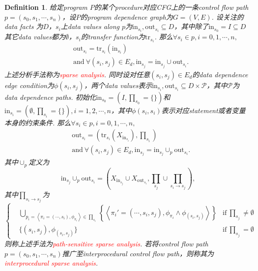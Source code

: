 \documentclass{article}
\newtheorem{definition}[theorem]{Definition}
\newcommand{\redt}[1]{\textcolor{red}{#1}}
\newcommand{\abracket}[1]{\ensuremath{\left< #1 \right>}}
\begin{document}
\newpage
\begin{definition}
\rm 给定program $P$的某个procedure对应CFG上的一条control flow path  $p = (s_0, s_1,\cdots, s_n)$，设$P$的program dependence graph为$G = (V,E)$. 设关注的data facts 为$D$，$s_i$上data values along $p$为$\text{in}_{s_i},\text{out}_{s_i} \subseteq D$，其中除了$\text{in}_{s_0} = I \subseteq D$其它data values都为$\emptyset$，$s_i$的transfer function为$\text{tr}_{s_i}$. 那么$\forall s_i \in p, i=0,1,\cdots,n,$
$$
\begin{aligned}
&\text{out}_{s_i} = \text{tr}_{s_i}(\text{in}_{s_i}) \\
&\text{and}~\forall (s_i,s_j) \in E_d,  \text{in}_{s_j} = \text{in}_{s_j} \cup \text{out}_{s_i}. 
\end{aligned}
$$
上述分析手法称为\redt{sparse analysis}. 同时设对任意$(s_i,s_j)\in E_d$的data dependence edge condition为$\phi(s_i,s_j)$，两个data values表示$\text{in}_{s_i},\text{out}_{s_i} \subseteq D \times \mathcal{P}$，其中$\mathcal{P}$为data dependence paths. 初始化$\text{in}_{s_0} = (I,\prod_{s_0} = \{\})$和$\text{in}_{s_i} = (\emptyset,\prod_{s_i}=\{\}),i=1,2,\cdots,n$，其中$\phi(s_i,s_i)$表示对应statement或者变量本身的约束条件. 那么$\forall s_i \in p, i=0,1,\cdots,n,$
$$
\begin{aligned}
&\text{out}_{s_i} = \left(\text{tr}_{s_i}\left(X_{\text{in}_{s_i}}\right),{\prod}_{s_i}\right) \\
&\text{and}~\forall (s_i,s_j) \in E_d,  \text{in}_{s_j} = \text{in}_{s_j} \cup_p \text{out}_{s_i}.
\end{aligned}
$$
其中$\cup_p$定义为
$$
\text{in}_{s_j} \cup_p \text{out}_{s_i} =  \left( X_{\text{in}_{s_j}} \cup X_{\text{out}_{s_i}},  {\prod}_{s_j} \cup {\prod}_{s_i \to s_j}\right), 
$$
其中${\prod}_{s_i \to s_j}$为
$$
\left\{
\begin{aligned}
& \bigcup_{p_i = \abracket{\pi_i=(\cdots,s_i),\phi_{\pi_i}} \in \prod_{s_i}} \left\{\abracket{\pi_i'=(\cdots,s_i,s_j), \phi_{\pi_{i}} \wedge \phi_{(s_i,s_j)}}\right\} & \text{if}~{\prod}_{s_j} \neq \emptyset \\
&\{(s_i,s_j), \phi_{(s_i,s_j)}\} &  \text{if}~{\prod}_{s_j} = \emptyset
\end{aligned}
\right.
$$
则称上述手法为\redt{path-sensitive sparse analysis}. 若将control flow path $p=(s_0,s_1,\cdots,s_n)$推广至interprocedural control flow path，则称其为\redt{interprocedural sparse analysis}. 
\end{definition}
\end{document}
